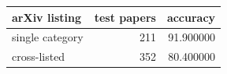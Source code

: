 \begin{tabular}{lrr}
\toprule
arXiv listing & test papers & accuracy \\
\midrule
single category & 211 & 91.900000 \\
cross-listed & 352 & 80.400000 \\
\bottomrule
\end{tabular}
